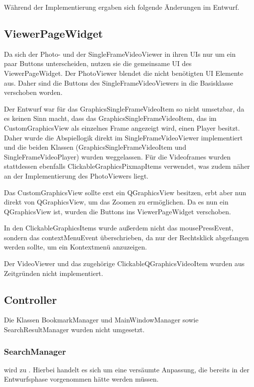 Während der Implementierung ergaben sich folgende Änderungen im Entwurf.

\subsection{ViewerPageWidget}
Da sich der Photo- und der SingleFrameVideoViewer in ihren UIs nur um ein paar Buttons unterscheiden, nutzen sie die gemeinsame UI des ViewerPageWidget. Der PhotoViewer blendet die nicht benötigten UI Elemente aus. Daher sind die Buttons des SingleFrameVideoViewers in die Basisklasse verschoben worden.

Der Entwurf war für das GraphicsSingleFrameVideoItem so nicht umsetzbar, da es keinen Sinn macht, dass das GraphicsSingleFrameVideoItem, das im CustomGraphicsView als einzelnes Frame angezeigt wird, einen Player besitzt. Daher wurde die Abspiellogik direkt im SingleFrameVideoViewer implementiert und die beiden Klassen (GraphicsSingleFrameVideoItem und SingleFrameVideoPlayer) wurden weggelassen. Für die Videoframes wurden stattdessen ebenfalls ClickableGraphicsPixmapItems verwendet, was zudem näher an der Implementierung des PhotoViewers liegt.

Das CustomGraphicsView sollte erst ein QGraphicsView besitzen, erbt aber nun direkt von QGraphicsView, um das Zoomen zu ermöglichen. Da es nun ein QGraphicsView ist, wurden die Buttons ins ViewerPageWidget verschoben.

In den ClickableGraphicsItems wurde außerdem nicht das mousePressEvent, sondern das contextMenuEvent überschrieben, da nur der Rechtsklick abgefangen werden sollte, um ein Kontextmenü anzuzeigen.

Der VideoViewer und das zugehörige ClickableQGraphicsVideoItem wurden aus Zeitgründen nicht implementiert.

\subsection{Controller}
Die Klassen BookmarkManager und MainWindowManager sowie SearchResultManager wurden nicht umgesetzt.

\subsubsection{SearchManager}
 wird zu . Hierbei handelt es sich um eine versäumte Anpassung, die bereits in der Entwurfsphase vorgenommen hätte werden müssen.

